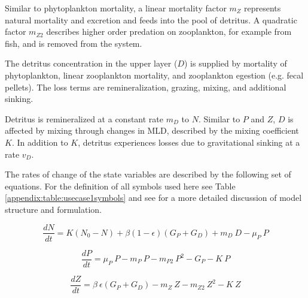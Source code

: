 \documentclass[journal abbreviation, manuscript]{copernicus}
\begin{document}
Similar to phytoplankton mortality, a linear mortality factor $m_Z$ represents natural mortality and excretion and feeds into the pool of detritus. A quadratic factor $m_{Z2}$ describes higher order predation on zooplankton, for example from fish, and is removed from the system. 

The detritus concentration in the upper layer ($D$) is supplied by mortality of phytoplankton, linear zooplankton mortality, and zooplankton egestion (e.g. fecal pellets). The loss terms are remineralization, grazing, mixing, and additional sinking. 

Detritus is remineralized at a constant rate $m_D$ to $N$. Similar to $P$ and $Z$, $D$ is affected by mixing through changes in MLD, described by the mixing coefficient $K$. In addition to $K$, detritus experiences losses due to gravitational sinking at a rate $v_D$. 

The rates of change of the state variables are described by the following set of equations. For the definition of all symbols used here see Table \ref{appendix:table:usecase1symbols} and see \citet{Anderson2015c} for a more detailed discussion of model structure and formulation.

\begin{equation}
    \frac{d N}{d t} = 
    K (N_0 - N) %
    + \beta(1 - \epsilon)(G_P + G_D) %
    + m_D \ D %
    - \mu_{P} \ P %
\end{equation}

\begin{equation}
    \frac{d P}{d t} =
    \mu_{P} \ P  %
    - m_P \ P %
    - m_{P2} \ P^2 %
    - G_P %
    - K \ P %
\end{equation}

\begin{equation}
    \frac{d Z}{d t} =
    \beta \ \epsilon(G_P + G_D) %
    - m_Z \ Z %
    - m_{Z2} \ Z^2 %
    - K \ Z %
\end{equation}
\end{document}

